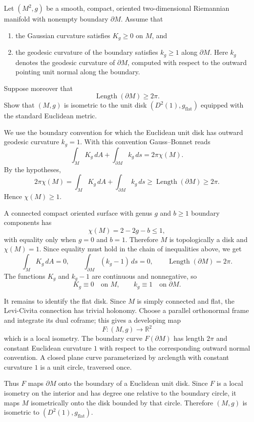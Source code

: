 \begin{exercise}
\label{geometry:2026:2}
Let $(M^2,g)$ be a smooth, compact, oriented two-dimensional Riemannian manifold
with nonempty boundary $\partial M$. Assume that
\begin{enumerate}
    \item the Gaussian curvature satisfies $K_g\geq 0$ on $M$, and
    \item the geodesic curvature of the boundary satisfies $k_g\geq 1$ along
    $\partial M$. Here $k_g$ denotes the geodesic curvature of $\partial M$,
    computed with respect to the outward pointing unit normal along the boundary.
\end{enumerate}
Suppose moreover that
\[
    \operatorname{Length}(\partial M)\geq 2\pi.
\]
Show that $(M,g)$ is isometric to the unit disk $(D^2(1),g_{\mathrm{flat}})$
equipped with the standard Euclidean metric.
\end{exercise}

\begin{solution}
We use the boundary convention for which the Euclidean unit disk has outward
geodesic curvature $k_g=1$. With this convention Gauss--Bonnet reads
\[
    \int_M K_g\,dA+\int_{\partial M} k_g\,ds=2\pi\chi(M).
\]
By the hypotheses,
\[
    2\pi\chi(M)
    =
    \int_M K_g\,dA+\int_{\partial M} k_g\,ds
    \geq
    \operatorname{Length}(\partial M)
    \geq 2\pi.
\]
Hence $\chi(M)\geq 1$.

A connected compact oriented surface with genus $g$ and $b\geq 1$ boundary
components has
\[
    \chi(M)=2-2g-b\leq 1,
\]
with equality only when $g=0$ and $b=1$. Therefore $M$ is topologically a disk and
$\chi(M)=1$. Since equality must hold in the chain of inequalities above, we get
\[
    \int_M K_g\,dA=0,\qquad
    \int_{\partial M}(k_g-1)\,ds=0,\qquad
    \operatorname{Length}(\partial M)=2\pi.
\]
The functions $K_g$ and $k_g-1$ are continuous and nonnegative, so
\[
    K_g\equiv 0\quad\text{on }M,\qquad
    k_g\equiv 1\quad\text{on }\partial M.
\]

It remains to identify the flat disk. Since $M$ is simply connected and flat, the
Levi-Civita connection has trivial holonomy. Choose a parallel orthonormal frame
and integrate its dual coframe; this gives a developing map
\[
    F:(M,g)\longrightarrow \mathbb{R}^2
\]
which is a local isometry. The boundary curve $F(\partial M)$ has length $2\pi$
and constant Euclidean curvature $1$ with respect to the corresponding outward
normal convention. A closed plane curve parameterized by arclength with constant
curvature $1$ is a unit circle, traversed once.

Thus $F$ maps $\partial M$ onto the boundary of a Euclidean unit disk. Since $F$ is
a local isometry on the interior and has degree one relative to the boundary circle,
it maps $M$ isometrically onto the disk bounded by that circle. Therefore
$(M,g)$ is isometric to $(D^2(1),g_{\mathrm{flat}})$.
\end{solution}

